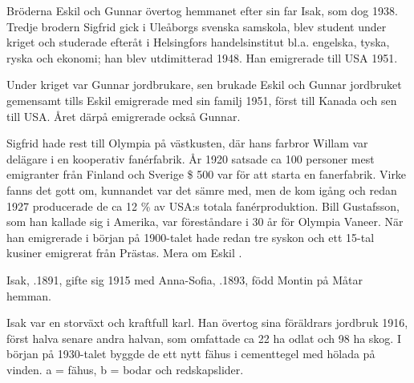 
%
Bröderna Eskil och Gunnar övertog hemmanet efter sin far Isak, som dog 1938. Tredje brodern Sigfrid gick i Uleåborgs svenska samskola, blev student under kriget och studerade efteråt i Helsingfors handelsinstitut bl.a. engelska, tyska, ryska och ekonomi; han blev utdimitterad 1948. Han emigrerade till USA 1951.

Under kriget var Gunnar jordbrukare, sen brukade Eskil och Gunnar jordbruket gemensamt tills Eskil emigrerade med sin familj 1951, först till Kanada och sen till USA. Året därpå emigrerade också Gunnar.

Sigfrid hade rest till Olympia på västkusten, där hans farbror Willam var delägare i en kooperativ fanérfabrik. År 1920 satsade ca 100 personer mest emigranter från Finland och Sverige \$ 500 var för att starta en fanerfabrik. Virke fanns det gott om, kunnandet var det sämre med, men de kom igång och redan 1927 producerade de ca 12 \% av USA:s totala fanérproduktion. Bill Gustafsson, som han kallade sig i Amerika, var föreståndare i 30 år för Olympia Vaneer. När han emigrerade i början på 1900-talet hade redan tre syskon och ett 15-tal kusiner emigrerat från Prästas. Mera om Eskil .


%
Isak, .1891, gifte sig 1915 med Anna-Sofia, .1893, född Montin på Måtar hemman.
\begin{jhchildren}
  \item {}
  \item {}
  \item {}
  \item {}
  \item {}
  \item {}
\end{jhchildren}
Isak var en storväxt och kraftfull karl. Han övertog sina föräldrars jordbruk 1916, först halva senare andra halvan, som omfattade ca 22 ha odlat och 98 ha skog. I början på 1930-talet byggde de ett nytt fähus i cementtegel med hölada på vinden. a = fähus, b = bodar och redskapslider.

